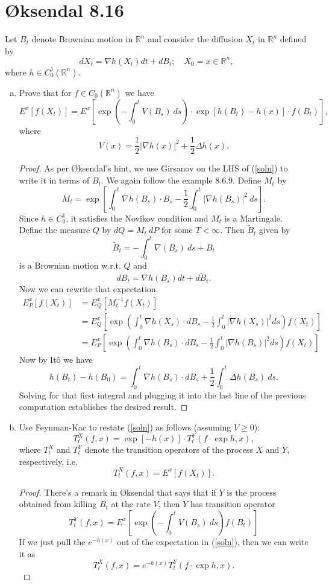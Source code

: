 \documentclass[11pt,letterpaper]{report}
\newcommand{\reals}{\mathbb{R}}
\begin{document}
\section*{\O ksendal 8.16}
Let $B_t$ denote Brownian motion in $\reals^n$ and consider the diffusion $X_t$ in $\reals^n$ defined by
\[
dX_t = \nabla h(X_t)dt + dB_t;\quad X_0 = x\in \reals^n,
\]
where $h\in C_0^1(\reals^n)$.
\begin{enumerate}[(a)]
	\item Prove that for $f\in C_0(\reals^n)$ we have
	\begin{equation}\label{soln}
	E^x[f(X_t)] = E^x\left[\exp\left(-\int_0^tV(B_s)\ ds\right)\cdot \exp[h(B_t)-h(x)]\cdot f(B_t)\right],
	\end{equation}
	where
	\[
	V(x) = \frac{1}{2}|\nabla h(x)|^2 + \frac{1}{2}\Delta h(x).
	\]
	\begin{proof}
		As per \O ksendal's hint, we use Girsanov on the LHS of (\ref{soln}) to write it in terms of $B_t$. We again follow the example 8.6.9. Define $M_t$ by
		\[
		M_t = \exp\left[\int_0^t \nabla h(B_s)\cdot B_s - \frac{1}{2}\int_0^t|\nabla h(B_s)|^2\ ds\right].
		\]
		Since $h\in C_0^1$, it satisfies the Novikov condition and $M_t$ is a Martingale. Define the measure $Q$ by $dQ = M_t\ dP$ for some $T<\infty$. Then $\tilde B_t$ given by
		\[
		\tilde B_t = -\int_0^t\nabla(B_s)\ ds + B_t
		\]
		is a Brownian motion w.r.t. $Q$ and
		\[
		dB_t = \nabla h(B_s)dt + d\tilde B_t.
		\]
		Now we can rewrite that expectation.
		\begin{align*}
			E^x_P[f(X_t)] &= E^x_Q[M_t^{-1}f(X_t)]\\
			&= E_Q^x\left[\exp\left(\int_0^t\nabla h(X_s)\cdot dB_s - \frac{1}{2}\int_0^t|\nabla h(X_s)|^2ds\right)f(X_t)\right]\\
			&= E^x_P\left[\exp\left(\int_0^t\nabla h(B_s)\cdot dB_s - \frac{1}{2}\int_0^t|\nabla h(B_s)|^2ds\right)f(X_t)\right]
		\end{align*}
		Now by It\^o we have
		\[
		h(B_t) - h(B_0) = \int_0^t\nabla h(B_s)\cdot dB_s + \frac{1}{2}\int_0^t \Delta h(B_s)\ ds.
		\]
		Solving for that first integral and plugging it into the last line of the previous computation establishes the desired result.
	\end{proof}

	\item Use Feynman-Kac to restate (\ref{soln}) as follows (assuming $V\geq 0$):
	\[
	T_t^X(f,x) = \exp[-h(x)]\cdot T_t^Y(f\cdot \exp h, x),
	\]
	where $T_t^X$ and $T_t^Y$ denote the transition operators of the process $X$ and $Y$, respectively, i.e.
	\[
	T_t^X(f,x) = E^x[f(X_t)].
	\]
	\begin{proof}
		There's a remark in \O ksendal that says that if $Y$ is the process obtained from killing $B_t$ at the rate $V$, then $Y$ has transition operator
		\[
		T_t^Y(f,x) = E^x\left[\exp\left(-\int_0^tV(B_s)\ ds\right)f(B_t)\right]
		\]
		If we just pull the $e^{-h(x)}$ out of the expectation in (\ref{soln}), then we can write it as
		\[
		T_t^X(f,x) = e^{-h(x)}T_t^Y(f\cdot \exp h, x).
		\]
	\end{proof}
\end{enumerate}
\end{document}
